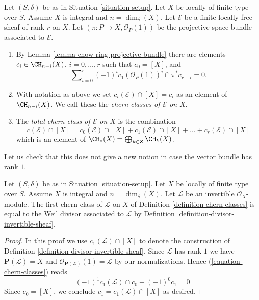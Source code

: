 \begin{definition}
\label{definition-chern-classes}
Let $(S, \delta)$ be as in Situation \ref{situation-setup}.
Let $X$ be locally of finite type over $S$.
Assume $X$ is integral and $n = \dim_\delta(X)$.
Let $\mathcal{E}$ be a finite locally free sheaf of rank $r$
on $X$. Let $(\pi : P \to X, \mathcal{O}_P(1))$ be the projective space
bundle associated to $\mathcal{E}$.
\begin{enumerate}
\item By Lemma \ref{lemma-chow-ring-projective-bundle} there are
elements $c_i \in \CH_{n - i}(X)$, $i = 0, \ldots, r$
such that $c_0 = [X]$, and
\begin{equation}
\label{equation-chern-classes}
\sum\nolimits_{i = 0}^r
(-1)^i c_1(\mathcal{O}_P(1))^i \cap \pi^*c_{r - i}
= 0.
\end{equation}
\item With notation as above we set
$c_i(\mathcal{E}) \cap [X] = c_i$
as an element of $\CH_{n - i}(X)$.
We call these the {\it chern classes of $\mathcal{E}$ on $X$}.
\item The {\it total chern class of $\mathcal{E}$ on $X$}
is the combination
$$
c({\mathcal E}) \cap [X] =
c_0({\mathcal E}) \cap [X]
+ c_1({\mathcal E}) \cap [X] + \ldots
+ c_r({\mathcal E}) \cap [X]
$$
which is an element of
$\CH_*(X) = \bigoplus_{k \in \mathbf{Z}} \CH_k(X)$.
\end{enumerate}
\end{definition}

\noindent
Let us check that this does not give a new notion in case the
vector bundle has rank $1$.

\begin{lemma}
\label{lemma-first-chern-class}
Let $(S, \delta)$ be as in Situation \ref{situation-setup}.
Let $X$ be locally of finite type over $S$.
Assume $X$ is integral and $n = \dim_\delta(X)$.
Let $\mathcal{L}$ be an invertible $\mathcal{O}_X$-module.
The first chern class of $\mathcal{L}$ on $X$ of
Definition \ref{definition-chern-classes}
is equal to the Weil divisor associated to $\mathcal{L}$
by Definition \ref{definition-divisor-invertible-sheaf}.
\end{lemma}

\begin{proof}
In this proof we use $c_1(\mathcal{L}) \cap [X]$ to denote the
construction of Definition \ref{definition-divisor-invertible-sheaf}.
Since $\mathcal{L}$ has rank $1$ we have
$\mathbf{P}(\mathcal{L}) = X$ and
$\mathcal{O}_{\mathbf{P}(\mathcal{L})}(1) = \mathcal{L}$
by our normalizations. Hence (\ref{equation-chern-classes})
reads
$$
(-1)^1 c_1(\mathcal{L}) \cap c_0 + (-1)^0 c_1 = 0
$$
Since $c_0 = [X]$, we conclude $c_1 = c_1(\mathcal{L}) \cap [X]$
as desired.
\end{proof}

